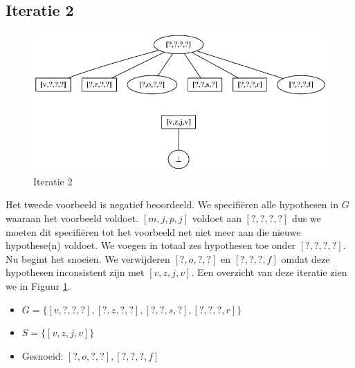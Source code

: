 \documentclass[alternative-exam.tex]{subfiles}
\begin{document}
\subsection{Iteratie 2}
\begin{figure}
[H]
\centering
\caption{Iteratie 2}
\label{iter_2}
\includegraphics[scale=0.5]{resources/graphs/iteration_2.png}
\end{figure}
Het tweede voorbeeld is negatief beoordeeld. We specifi\"eren alle hypothesen in $G$ waaraan het voorbeeld voldoet. $[m,j,p,j]$ voldoet aan $[?,?,?,?]$ dus we moeten dit specifi\"eren tot het voorbeeld net niet meer aan die nieuwe hypothese(n) voldoet. We voegen in totaal zes hypothesen toe onder $[?,?,?,?]$. Nu begint het snoeien. We verwijderen $[?,o,?,?]$ en $[?,?,?,f]$ omdat deze hypothesen inconsistent zijn met $[v,z,j,v]$. Een overzicht van deze iteratie zien we in Figuur \ref{iter_2}.
\begin{itemize}
\item $G = \{[v,?,?,?],[?,z,?,?],[?,?,s,?],[?,?,?,r]\}$
\item $S = \{[v,z,j,v]\}$
\item Gesnoeid: $[?,o,?,?],[?,?,?,f]$
\end{itemize}
\end{document}
